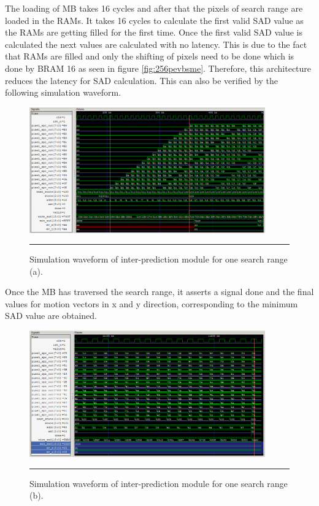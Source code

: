The loading of MB takes 16 cycles and after that the pixels of search range are loaded in the RAMs. It takes 16 cycles to calculate the first valid SAD value as the RAMs are getting filled for the first time. Once the first valid SAD value is calculated the next values are calculated with no latency. This is due to the fact that RAMs are filled and only the shifting of pixels need to be done which is done by BRAM 16 as seen in figure \ref{fig:256pevbsme}. Therefore, this architecture reduces the latency for SAD calculation. This can also be verified by the following simulation waveform.
\begin{figure}[H]
	\centering
	\includegraphics[width = 4in]{./Figures/wave3.png}
	\rule{35em}{0.5pt}
	\caption{Simulation waveform of inter-prediction module for one search range (a).}
	\label{fig:wave3}
\end{figure}
Once the MB has traversed the search range, it asserts a signal done and the final values for motion vectors in x and y direction, corresponding to the minimum SAD value are obtained. 
\begin{figure}[H]
	\centering
	\includegraphics[width = 4in]{./Figures/wave2.png}
	\rule{35em}{0.5pt}
	\caption{Simulation waveform of inter-prediction module for one search range (b).}
	\label{fig:wave2}
\end{figure}

